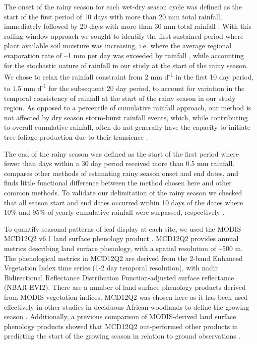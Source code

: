 \documentclass[11pt,a4paper]{article}
\begin{document}
The onset of the rainy season for each wet-dry season cycle was defined as the
start of the first period of 10 days with more than 20 mm total rainfall,
immediately followed by 20 days with more than 30 mm total rainfall
\citep{Tadross2005}. With this rolling window approach we sought to identify
the first sustained period where plant available soil moisture was increasing,
i.e. where the average regional evaporation rate of \textasciitilde{}1 mm per
day was exceeded by rainfall \citep{Campbell1996}, while accounting for the
stochastic nature of rainfall in our study at the start of the rainy season. We
chose to relax the rainfall constraint from 2 mm d\textsuperscript{-1} in the
first 10 day period, to 1.5 mm d\textsuperscript{-1} for the subsequent 20 day
period, to account for variation in the temporal consistency of rainfall at the
start of the rainy season in our study region. As opposed to a percentile of
cumulative rainfall approach, our method is not affected by dry season
storm-burst rainfall events, which, while contributing to overall cumulative
rainfall, often do not generally have the capacity to initiate tree foliage
production due to their transience \citep{February2016}. 

The end of the rainy season was defined as the start of the first period where
fewer than  days within a 30 day period received more than
0.5 mm rainfall. \citet{Guan2014} compares other methods of estimating rainy
season onset and end dates, and finds little functional difference between the
method chosen here and other common methods. To validate our delimitation of
the rainy season we checked that all season start and end dates occurred within
10 days of the dates where 10\% and 95\% of yearly cumulative rainfall were
surpassed, respectively \citep{Adole2018b}. 

To quantify seasonal patterns of leaf display at each site, we used the MODIS
MCD12Q2 v6.1 land surface phenology product \citep{MCD12Q2}. MCD12Q2 provides
annual metrics describing land surface phenology, with a spatial resolution of
\textasciitilde{}500 m. The phenological metrics in MCD12Q2 are derived from
the 2-band Enhanced Vegetation Index time series (1-2 day temporal resolution),
with nadir Bidirectional Reflectance Distribution Function-adjusted surface
reflectance (NBAR-EVI2). There are a number of land surface phenology products
derived from MODIS vegetation indices. MCD12Q2 was chosen here as it has been
used effectively in other studies in deciduous African woodlands to define the
growing season \citep{Begue2014, Adole2018a}. Additionally, a previous
comparison of MODIS-derived land surface phenology products showed that MCD12Q2
out-performed other products in predicting the start of the growing season in
relation to ground observations \citep{Peng2017}. 
\end{document}
